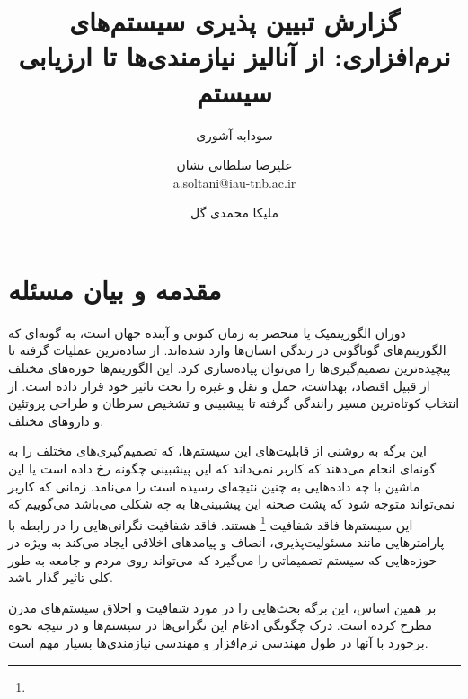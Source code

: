 \documentclass[10pt, a4paper]{article}
\title{گزارش تبیین پذیری سیستم‌های نرم‌افزاری: از آنالیز نیازمندی‌ها تا ارزیابی
سیستم}
\author{
    سودابه آشوری \\
  \and
    علیرضا سلطانی نشان \\
    a.soltani@iau-tnb.ac.ir
  \and
    ملیکا محمدی گل \\
}
\begin{document}
\maketitle

\section{مقدمه و بیان مسئله}

دوران الگوریتمیک یا  منحصر به زمان کنونی و آینده جهان است،
به گونه‌ای که الگوریتم‌های گوناگونی در زندگی انسان‌ها وارد شده‌اند. از ساده‌ترین
عملیات گرفته تا پیچیده‌ترین تصمیم‌گیری‌ها را می‌توان پیاده‌سازی کرد. این
الگوریتم‌ها حوزه‌های مختلف از قبیل اقتصاد، بهداشت، حمل و نقل و غیره را تحت تاثیر
خود قرار داده است. از انتخاب کوتاه‌ترین مسیر رانندگی گرفته تا پیشبینی و تشخیص
سرطان و طراحی پروتئین و دارو‌های مختلف.

این برگه به روشنی از قابلیت‌های این سیستم‌ها، که تصمیم‌گیری‌های مختلف را به
گونه‌ای انجام می‌دهند که کاربر نمی‌داند که این پیشبینی چگونه رخ داده است یا این
ماشین با چه داده‌هایی به چنین نتیجه‌ای رسیده است را 
می‌نامد. زمانی که کاربر نمی‌تواند متوجه شود که پشت صحنه این پیشبینی‌ها به چه
شکلی می‌باشد می‌گوییم که این سیستم‌ها فاقد شفافیت \footnote{}
هستند. فاقد شفافیت نگرانی‌هایی را در رابطه با پارامتر‌هایی مانند مسئولیت‌پذیری،
انصاف و پیامد‌های اخلاقی ایجاد می‌کند به ویژه در حوزه‌هایی که سیستم تصمیماتی را
می‌گیرد که می‌تواند روی مردم و جامعه به طور کلی تاثیر گذار باشد.

بر همین اساس، این برگه بحث‌هایی را در مورد شفافیت و اخلاق سیستم‌های مدرن مطرح
کرده است. درک چگونگی ادغام این نگرانی‌ها در سیستم‌ها و در نتیجه نحوه برخورد با
آنها در طول مهندسی نرم‌افزار و مهندسی نیازمندی‌ها بسیار مهم است.

\newpage
\tableofcontents
\newpage

\end{document}
